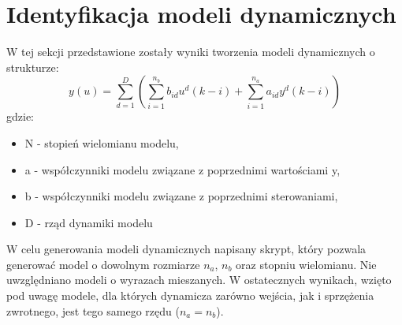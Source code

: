\section{Identyfikacja modeli dynamicznych}
W tej sekcji przedstawione zostały wyniki tworzenia modeli dynamicznych o strukturze:
\begin{equation}
y(u)=\sum_{d=1}^{D}\left(\sum_{i=1}^{n_{b}}b_{id}u^d(k-i)+\sum_{i=1}^{n_{a}}a_{id}y^{d}(k-i)\right)
\end{equation}
gdzie:
\begin{itemize}
\item N - stopień wielomianu modelu,
\item a - współczynniki modelu związane z poprzednimi wartościami y,
\item b - współczynniki modelu związane z poprzednimi sterowaniami,
\item D - rząd dynamiki modelu
\end{itemize}
W celu generowania modeli dynamicznych napisany skrypt, który pozwala generować model o dowolnym rozmiarze $n_{a}$, $n_{b}$ oraz stopniu wielomianu. Nie uwzględniano modeli o wyrazach mieszanych. W ostatecznych wynikach, wzięto pod uwagę modele, dla których dynamicza zarówno wejścia, jak i sprzężenia zwrotnego, jest tego samego rzędu ($n_{a}=n_{b}$).
